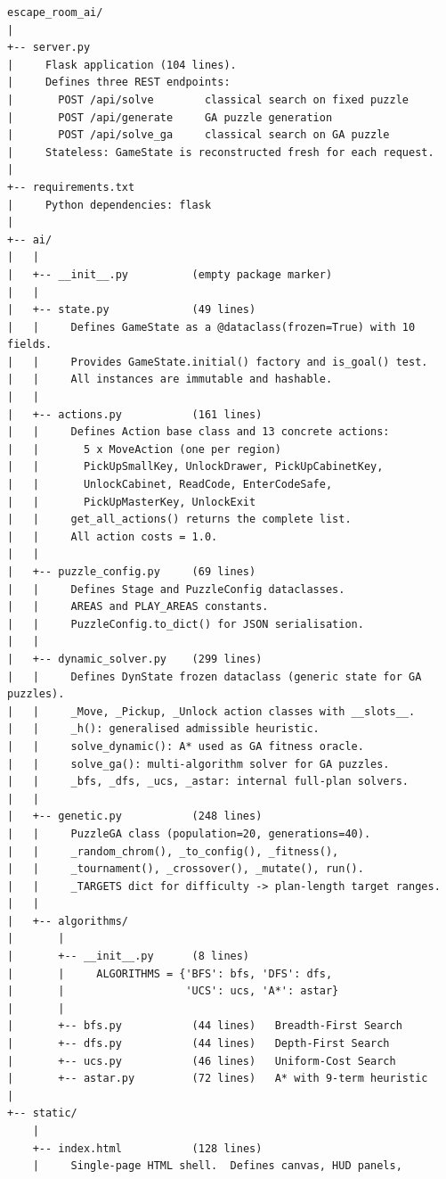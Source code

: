 \documentclass[12pt, a4paper]{report}
\begin{document}
\begin{verbatim}
escape_room_ai/
|
+-- server.py
|     Flask application (104 lines).
|     Defines three REST endpoints:
|       POST /api/solve        classical search on fixed puzzle
|       POST /api/generate     GA puzzle generation
|       POST /api/solve_ga     classical search on GA puzzle
|     Stateless: GameState is reconstructed fresh for each request.
|
+-- requirements.txt
|     Python dependencies: flask
|
+-- ai/
|   |
|   +-- __init__.py          (empty package marker)
|   |
|   +-- state.py             (49 lines)
|   |     Defines GameState as a @dataclass(frozen=True) with 10 fields.
|   |     Provides GameState.initial() factory and is_goal() test.
|   |     All instances are immutable and hashable.
|   |
|   +-- actions.py           (161 lines)
|   |     Defines Action base class and 13 concrete actions:
|   |       5 x MoveAction (one per region)
|   |       PickUpSmallKey, UnlockDrawer, PickUpCabinetKey,
|   |       UnlockCabinet, ReadCode, EnterCodeSafe,
|   |       PickUpMasterKey, UnlockExit
|   |     get_all_actions() returns the complete list.
|   |     All action costs = 1.0.
|   |
|   +-- puzzle_config.py     (69 lines)
|   |     Defines Stage and PuzzleConfig dataclasses.
|   |     AREAS and PLAY_AREAS constants.
|   |     PuzzleConfig.to_dict() for JSON serialisation.
|   |
|   +-- dynamic_solver.py    (299 lines)
|   |     Defines DynState frozen dataclass (generic state for GA puzzles).
|   |     _Move, _Pickup, _Unlock action classes with __slots__.
|   |     _h(): generalised admissible heuristic.
|   |     solve_dynamic(): A* used as GA fitness oracle.
|   |     solve_ga(): multi-algorithm solver for GA puzzles.
|   |     _bfs, _dfs, _ucs, _astar: internal full-plan solvers.
|   |
|   +-- genetic.py           (248 lines)
|   |     PuzzleGA class (population=20, generations=40).
|   |     _random_chrom(), _to_config(), _fitness(),
|   |     _tournament(), _crossover(), _mutate(), run().
|   |     _TARGETS dict for difficulty -> plan-length target ranges.
|   |
|   +-- algorithms/
|       |
|       +-- __init__.py      (8 lines)
|       |     ALGORITHMS = {'BFS': bfs, 'DFS': dfs,
|       |                   'UCS': ucs, 'A*': astar}
|       |
|       +-- bfs.py           (44 lines)   Breadth-First Search
|       +-- dfs.py           (44 lines)   Depth-First Search
|       +-- ucs.py           (46 lines)   Uniform-Cost Search
|       +-- astar.py         (72 lines)   A* with 9-term heuristic
|
+-- static/
    |
    +-- index.html           (128 lines)
    |     Single-page HTML shell.  Defines canvas, HUD panels,

\end{verbatim}
\end{document}

